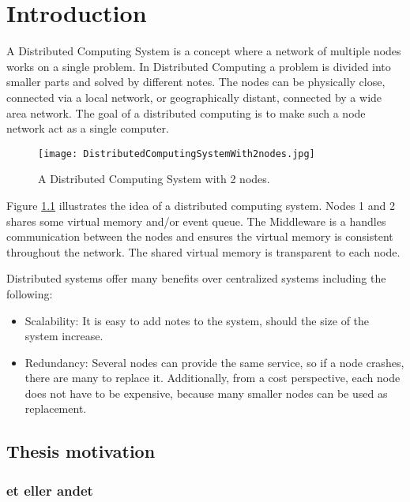 \chapter{Introduction}

A Distributed Computing System is a concept where a network of multiple nodes works on a single problem. In Distributed Computing a problem is divided into smaller parts and solved by different notes. The nodes can be physically close, connected via a local network, or geographically distant, connected by a wide area network. The goal of a distributed computing is to make such a node network act as a single computer.

\begin{figure}
	\centering
	\texttt{[image: DistributedComputingSystemWith2nodes.jpg]} 
	\caption[Distributed Computing System with 2 nodes]{
		\label{fig:distributedCoputingSystem} 
		\footnotesize{%
			A Distributed Computing System with 2 nodes.
		}
	}
\end{figure}

Figure \cref{fig:distributedCoputingSystem} illustrates the idea of a distributed computing system. Nodes 1 and 2 shares some virtual memory and/or event queue. The Middleware is a handles communication between the nodes and ensures the virtual memory is consistent throughout the network. The shared virtual memory is transparent to each node. 

Distributed systems offer many benefits over centralized systems including the following:
\begin{itemize}
	\item Scalability: It is easy to add notes to the system, should the size of the system increase.
	\item Redundancy: Several nodes can provide the same service, so if a node crashes, there are many to replace it. Additionally, from a cost perspective, each node does not have to be expensive, because many smaller nodes can be used as replacement.
\end{itemize}

\section{Thesis motivation}



\subsection{et eller andet}

